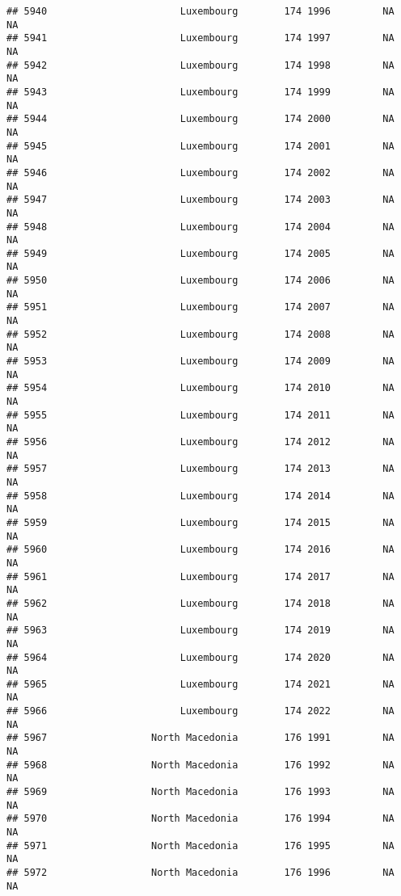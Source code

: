\documentclass[
]{article}
\begin{document}
\begin{verbatim}
## 5940                       Luxembourg        174 1996         NA         NA
## 5941                       Luxembourg        174 1997         NA         NA
## 5942                       Luxembourg        174 1998         NA         NA
## 5943                       Luxembourg        174 1999         NA         NA
## 5944                       Luxembourg        174 2000         NA         NA
## 5945                       Luxembourg        174 2001         NA         NA
## 5946                       Luxembourg        174 2002         NA         NA
## 5947                       Luxembourg        174 2003         NA         NA
## 5948                       Luxembourg        174 2004         NA         NA
## 5949                       Luxembourg        174 2005         NA         NA
## 5950                       Luxembourg        174 2006         NA         NA
## 5951                       Luxembourg        174 2007         NA         NA
## 5952                       Luxembourg        174 2008         NA         NA
## 5953                       Luxembourg        174 2009         NA         NA
## 5954                       Luxembourg        174 2010         NA         NA
## 5955                       Luxembourg        174 2011         NA         NA
## 5956                       Luxembourg        174 2012         NA         NA
## 5957                       Luxembourg        174 2013         NA         NA
## 5958                       Luxembourg        174 2014         NA         NA
## 5959                       Luxembourg        174 2015         NA         NA
## 5960                       Luxembourg        174 2016         NA         NA
## 5961                       Luxembourg        174 2017         NA         NA
## 5962                       Luxembourg        174 2018         NA         NA
## 5963                       Luxembourg        174 2019         NA         NA
## 5964                       Luxembourg        174 2020         NA         NA
## 5965                       Luxembourg        174 2021         NA         NA
## 5966                       Luxembourg        174 2022         NA         NA
## 5967                  North Macedonia        176 1991         NA         NA
## 5968                  North Macedonia        176 1992         NA         NA
## 5969                  North Macedonia        176 1993         NA         NA
## 5970                  North Macedonia        176 1994         NA         NA
## 5971                  North Macedonia        176 1995         NA         NA
## 5972                  North Macedonia        176 1996         NA         NA

\end{verbatim}
\end{document}
